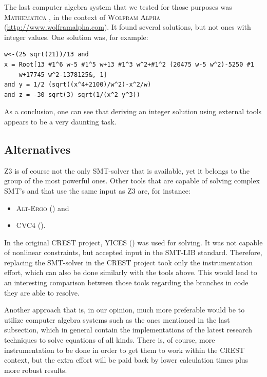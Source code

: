 \documentclass[oribibl, twocolumn]{llncs}
\begin{document}
The last computer algebra system that we tested for those purposes was
\textsc{Mathematica} \cite{wolfram1999mathematica}, in the context of
\textsc{Wolfram Alpha}\\ (\url{http://www.wolframalpha.com}). It found
several solutions, but not ones with integer values. One solution was,
for example:
\begin{verbatim}
w<-(25 sqrt(21))/13 and 
x = Root[13 #1^6 w-5 #1^5 w+13 #1^3 w^2+#1^2 (20475 w-5 w^2)-5250 #1
    w+17745 w^2-1378125&, 1]
and y = 1/2 (sqrt((x^4+2100)/w^2)-x^2/w)
and z = -30 sqrt(3) sqrt(1/(x^2 y^3))
\end{verbatim}

As a conclusion, one can see that deriving an integer solution using
external tools appears to be a very daunting task.

\subsection{Alternatives}

\textsc{Z3} is of course not the only \textsc{SMT}-solver that is
available, yet it belongs to the group of the most powerful
ones. Other tools that are capable of solving complex SMT's and that use the
same input as \textsc{Z3} are, for instance:
\begin{itemize}
  \item \textsc{Alt-Ergo} (\cite{bobotalt}) and
  \item \textsc{CVC4} (\cite{barrett2011cvc4}).
\end{itemize}

In the original \textsc{CREST} project, \textsc{YICES} (\cite{dutertre2006yices}) was used for
solving. It was not capable of nonlinear constraints, but accepted
input in the SMT-LIB standard. Therefore, replacing the SMT-solver in
the \textsc{CREST} project took only the instrumentation effort, which
can also be done similarly with the tools above. This would lead to an
interesting comparison between those tools regarding the branches in
code they are able to resolve.

Another approach that is, in our opinion, much more preferable would be
to utilize computer algebra systems such as the ones mentioned in the last subsection, 
which in general contain the implementations of the latest research techniques to solve equations
of all kinds. There is, of course, more instrumentation to be done in
order to get them to work within the \textsc{CREST} context, but the
extra effort will be paid back by lower calculation times plus more
robust results.
\end{document}
